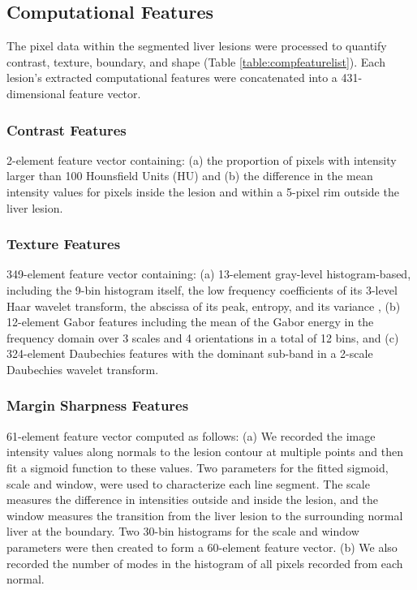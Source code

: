 \clearpage
\subsection{Computational Features}
The pixel data within the segmented liver lesions were processed to quantify contrast, texture, boundary, and shape (Table \ref{table:compfeaturelist}). Each lesion's extracted computational features were concatenated into a 431-dimensional feature vector.

\subsubsection{Contrast Features}
2-element feature vector containing: (a) the proportion of pixels with intensity larger than 100 Hounsfield Units (HU) and (b) the difference in the mean intensity values for pixels inside the lesion and within a 5-pixel rim outside the liver lesion.

\subsubsection{Texture Features}
349-element feature vector containing: (a) 13-element gray-level histogram-based, including the 9-bin histogram itself, the low frequency coefficients of its 3-level Haar wavelet transform, the abscissa of its peak, entropy, and its variance \cite{Strela:2002vq}, (b) 12-element Gabor features \cite{Zhao:2005wb} including the mean of the Gabor energy in the frequency domain over 3 scales and 4 orientations in a total of 12 bins, and (c) 324-element Daubechies features with the dominant sub-band in a 2-scale Daubechies wavelet transform.

\subsubsection{Margin Sharpness Features}
61-element feature vector computed as follows: (a) We recorded the image intensity values along normals to the lesion contour at multiple points and then fit a sigmoid function to these values.  Two parameters for the fitted sigmoid, scale and window, were used to characterize each line segment. The scale measures the difference in intensities outside and inside the lesion, and the window measures the transition from the liver lesion to the surrounding normal liver at the boundary. Two 30-bin histograms for the scale and window parameters were then created to form a 60-element feature vector. (b) We also recorded the number of modes in the histogram of all pixels recorded from each normal.

